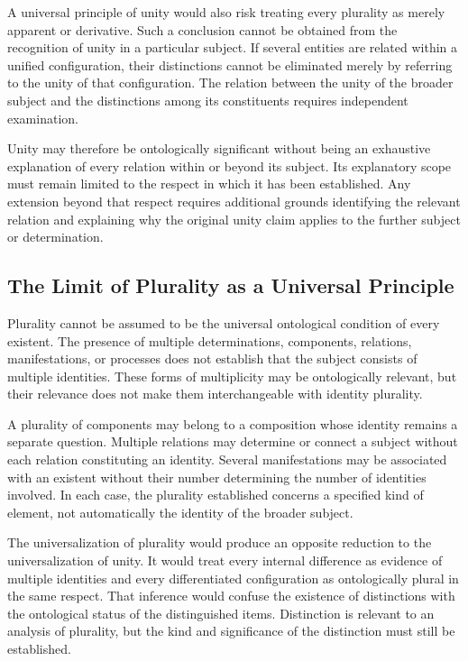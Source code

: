 A universal principle of unity would also risk treating
every plurality as merely apparent or derivative. Such
a conclusion cannot be obtained from the recognition
of unity in a particular subject. If several entities
are related within a unified configuration, their
distinctions cannot be eliminated merely by referring
to the unity of that configuration. The relation between
the unity of the broader subject and the distinctions
among its constituents requires independent examination.

Unity may therefore be ontologically significant without
being an exhaustive explanation of every relation within
or beyond its subject. Its explanatory scope must remain
limited to the respect in which it has been established.
Any extension beyond that respect requires additional
grounds identifying the relevant relation and explaining
why the original unity claim applies to the further
subject or determination.

\subsection{The Limit of Plurality as a Universal Principle}

Plurality cannot be assumed to be the universal
ontological condition of every existent. The presence
of multiple determinations, components, relations,
manifestations, or processes does not establish that
the subject consists of multiple identities. These
forms of multiplicity may be ontologically relevant,
but their relevance does not make them interchangeable
with identity plurality.

A plurality of components may belong to a composition
whose identity remains a separate question. Multiple
relations may determine or connect a subject without
each relation constituting an identity. Several
manifestations may be associated with an existent
without their number determining the number of
identities involved. In each case, the plurality
established concerns a specified kind of element,
not automatically the identity of the broader subject.

The universalization of plurality would produce an
opposite reduction to the universalization of unity.
It would treat every internal difference as evidence
of multiple identities and every differentiated
configuration as ontologically plural in the same
respect. That inference would confuse the existence
of distinctions with the ontological status of the
distinguished items. Distinction is relevant to an
analysis of plurality, but the kind and significance
of the distinction must still be established.

